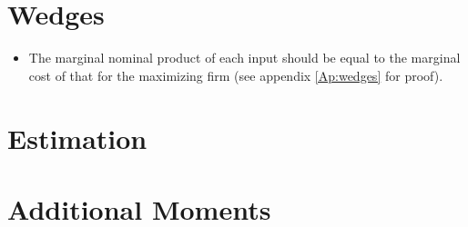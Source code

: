 \documentclass[12pt]{article} %
\begin{document}
\section*{Wedges}
\begin{itemize}
    \item The marginal nominal product of each input should be equal to the marginal cost of that for the maximizing firm (see appendix \ref{Ap:wedges} for proof).
	
\end{itemize}
\section*{Estimation}

\clearpage


\section*{Additional Moments}
\end{document}
